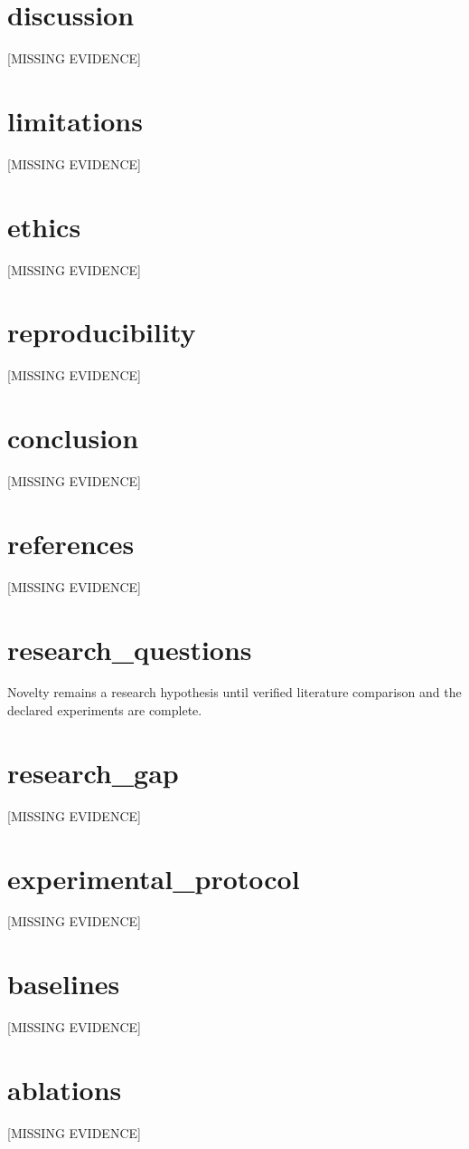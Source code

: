 \section{discussion}
[MISSING EVIDENCE]

\section{limitations}
[MISSING EVIDENCE]

\section{ethics}
[MISSING EVIDENCE]

\section{reproducibility}
[MISSING EVIDENCE]

\section{conclusion}
[MISSING EVIDENCE]

\section{references}
[MISSING EVIDENCE]

\section{research_questions}
Novelty remains a research hypothesis until verified literature comparison and the declared experiments are complete.

\section{research_gap}
[MISSING EVIDENCE]

\section{experimental_protocol}
[MISSING EVIDENCE]

\section{baselines}
[MISSING EVIDENCE]

\section{ablations}
[MISSING EVIDENCE]

